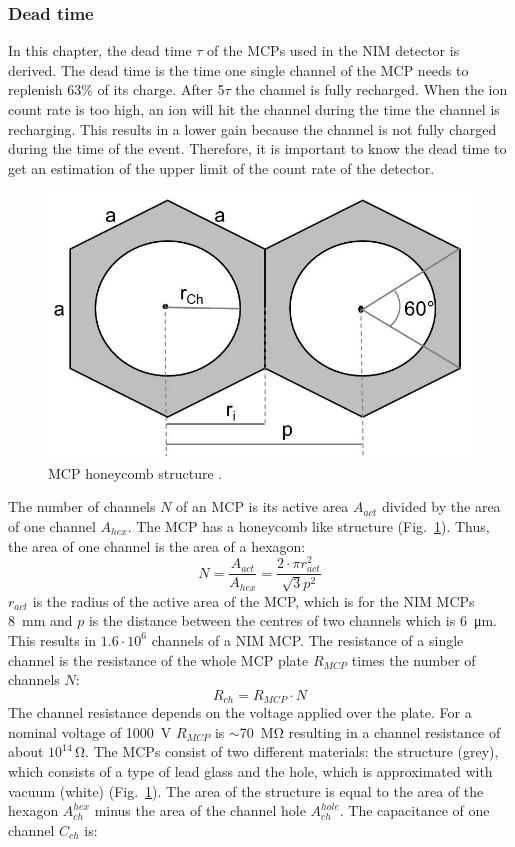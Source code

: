 	\subsubsection{Dead time}
	In this chapter, the dead time $\tau$ of the MCPs used in the NIM detector is derived. The dead time is the time one single channel of the MCP needs to replenish 63\% of its charge. After 5$\tau$ the channel is fully recharged. When the ion count rate is too high, an ion will hit the channel during the time the channel is recharging. This results in a lower gain because the channel is not fully charged during the time of the event. Therefore, it is important to know the dead time to get an estimation of the upper limit of the count rate of the detector.\\
	\begin{figure}[h]
		\centering
		\includegraphics[width=.4\textwidth]{Bilder/MCP_hex.jpg}
		\caption{MCP honeycomb structure \cite{Diss_Neuland}.}
		\label{fig:MCPhex}
	\end{figure}
	The number of channels $N$ of an MCP is its active area $A_{act}$ divided by the area of one channel $A_{hex}$. The MCP has a honeycomb like structure (Fig.~\ref{fig:MCPhex}). Thus, the area of one channel is the area of a hexagon:
	\begin{equation}
		N = \frac{A_{act}}{A_{hex}} = \frac{2\cdot\pi r^2_{act}}{\sqrt{3}p^2}
	\end{equation}
	$r_{act}$ is the radius of the active area of the MCP, which is for the NIM MCPs 8~mm and $p$ is the distance between the centres of two channels which is 6~\si{\micro\meter}. This results in $1.6\cdot10^6$ channels of a NIM MCP. The resistance of a single channel is the resistance of the whole MCP plate $R_{MCP}$ times the number of channels $N$:
	\begin{equation}
		R_{ch} = R_{MCP}\cdot N
	\end{equation}
	The channel resistance depends on the voltage applied over the plate. For a nominal voltage of 1000~\si{\volt} $R_{MCP}$ is $\sim$70~\si{\mega\ohm} resulting in a channel resistance of about $10^{14}$\,\si{\ohm}. The MCPs consist of two different materials: the structure (grey), which consists of a type of lead glass and the hole, which is approximated with vacuum (white) (Fig.~\ref{fig:MCPhex}). The area of the structure is equal to the area of the hexagon $A^{hex}_{ch}$ minus the area of the channel hole $A^{hole}_{ch}$. The capacitance of one channel $C_{ch}$ is:
